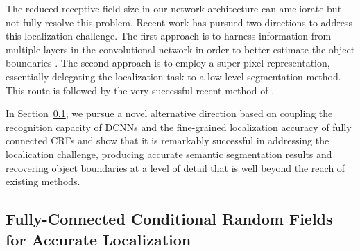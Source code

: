 The reduced receptive field size in our network architecture can ameliorate
but not fully resolve this problem. Recent work has pursued two directions to
address this localization challenge. The first approach is to harness
information from multiple layers in the convolutional network in order to
better estimate the object boundaries \citep{long2014fully, eigen2014predicting}. The second approach is
to employ a super-pixel representation, essentially delegating the
localization task to a low-level segmentation method. This route is followed
by the very successful recent method of \citet{mostajabi2014feedforward}.

In Section~\ref{sec:dense-crf}, we pursue a novel alternative direction based
on coupling the recognition capacity of DCNNs and the fine-grained
localization accuracy of fully connected CRFs and show that it is remarkably
successful in addressing the localication challenge, producing accurate
semantic segmentation results and recovering object boundaries at a level of
detail that is well beyond the reach of existing methods.  


\subsection{Fully-Connected Conditional Random Fields for Accurate Localization}
\label{sec:dense-crf}

